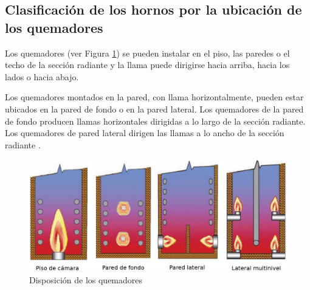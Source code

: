 \subsection{Clasificación de los hornos por la ubicación de los quemadores}
\par Los quemadores (ver Figura \ref{fig:quemadores}) se pueden instalar en el piso, las paredes o el techo de la sección radiante y la llama puede dirigirse hacia arriba, hacia los lados o hacia abajo. 
\par Los quemadores montados en la pared, con llama horizontalmente, pueden estar ubicados en la pared de fondo o en la pared lateral. Los quemadores de la pared de fondo producen llamas horizontales dirigidas a lo largo de la sección radiante. Los quemadores de pared lateral dirigen las llamas a lo ancho de la sección radiante \cite{kumar}.
\begin{figure}[H]
\begin{center}
\includegraphics[scale=0.30]{images/quemadores}
\caption[Disposición de los quemadores]{Disposición de los quemadores \cite{kumar}}
\label{fig:quemadores}
\end{center}
\end{figure}

